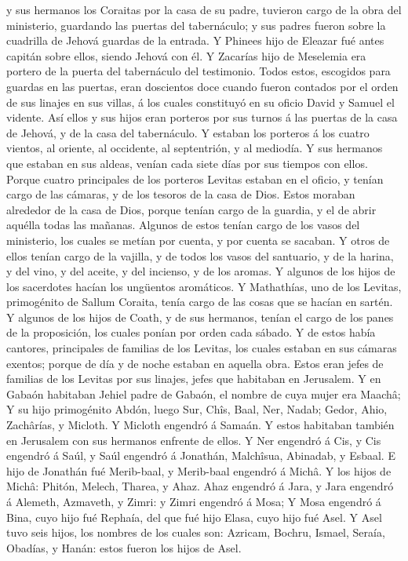y sus hermanos los Coraitas por la casa de su padre, tuvieron cargo de
la obra del ministerio, guardando las puertas del tabernáculo; y sus
padres fueron sobre la cuadrilla de Jehová guardas de la entrada.
 Y Phinees hijo de Eleazar fué antes capitán sobre ellos,
siendo Jehová con él.  Y Zacarías hijo de Meselemia era
portero de la puerta del tabernáculo del testimonio. 
Todos estos, escogidos para guardas en las puertas, eran doscientos doce
cuando fueron contados por el orden de sus linajes en sus villas, á los
cuales constituyó en su oficio David y Samuel el vidente.
 Así ellos y sus hijos eran porteros por sus turnos á las
puertas de la casa de Jehová, y de la casa del tabernáculo.
 Y estaban los porteros á los cuatro vientos, al oriente,
al occidente, al septentrión, y al mediodía.  Y sus
hermanos que estaban en sus aldeas, venían cada siete días por sus
tiempos con ellos.  Porque cuatro principales de los
porteros Levitas estaban en el oficio, y tenían cargo de las cámaras, y
de los tesoros de la casa de Dios.  Estos moraban
alrededor de la casa de Dios, porque tenían cargo de la guardia, y el de
abrir aquélla todas las mañanas.  Algunos de estos tenían
cargo de los vasos del ministerio, los cuales se metían por cuenta, y
por cuenta se sacaban.  Y otros de ellos tenían cargo de
la vajilla, y de todos los vasos del santuario, y de la harina, y del
vino, y del aceite, y del incienso, y de los aromas.  Y
algunos de los hijos de los sacerdotes hacían los ungüentos aromáticos.
 Y Mathathías, uno de los Levitas, primogénito de Sallum
Coraita, tenía cargo de las cosas que se hacían en sartén.
 Y algunos de los hijos de Coath, y de sus hermanos,
tenían el cargo de los panes de la proposición, los cuales ponían por
orden cada sábado.  Y de estos había cantores,
principales de familias de los Levitas, los cuales estaban en sus
cámaras exentos; porque de día y de noche estaban en aquella obra.
 Estos eran jefes de familias de los Levitas por sus
linajes, jefes que habitaban en Jerusalem.  Y en Gabaón
habitaban Jehiel padre de Gabaón, el nombre de cuya mujer era Maachâ;
 Y su hijo primogénito Abdón, luego Sur, Chîs, Baal, Ner,
Nadab;  Gedor, Ahio, Zachârías, y Micloth.
 Y Micloth engendró á Samaán. Y estos habitaban también
en Jerusalem con sus hermanos enfrente de ellos.  Y Ner
engendró á Cis, y Cis engendró á Saúl, y Saúl engendró á Jonathán,
Malchîsua, Abinadab, y Esbaal.  E hijo de Jonathán fué
Merib-baal, y Merib-baal engendró á Michâ.  Y los hijos
de Michâ: Phitón, Melech, Tharea, y Ahaz.  Ahaz engendró
á Jara, y Jara engendró á Alemeth, Azmaveth, y Zimri: y Zimri engendró á
Mosa;  Y Mosa engendró á Bina, cuyo hijo fué Rephaía, del
que fué hijo Elasa, cuyo hijo fué Asel.  Y Asel tuvo seis
hijos, los nombres de los cuales son: Azricam, Bochru, Ismael, Seraía,
Obadías, y Hanán: estos fueron los hijos de Asel.

